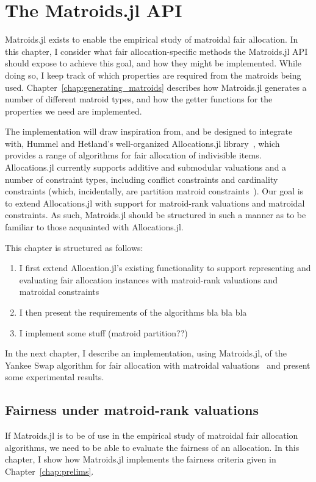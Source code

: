 \chapter{The Matroids.jl API}
\label{chap:matroids.jl}
Matroids.jl exists to enable the empirical study of matroidal fair allocation. In this chapter, I consider what fair allocation-specific methods the Matroids.jl API should expose to achieve this goal, and how they might be implemented. While doing so, I keep track of which properties are required from the matroids being used. Chapter~\ref{chap:generating_matroids} describes how Matroids.jl generates a number of different matroid types, and how the getter functions for the properties we need are implemented.

The implementation will draw inspiration from, and be designed to integrate with, Hummel and Hetland's well-organized Allocations.jl library~\cite{Hetland_Allocations_jl_2022}, which provides a range of algorithms for fair allocation of indivisible items. Allocations.jl currently supports additive and submodular valuations and a number of constraint types, including conflict constraints and cardinality constraints (which, incidentally, are partition matroid constraints~\cite{barman2020fair}). Our goal is to extend Allocations.jl with support for matroid-rank valuations and matroidal constraints. As such, Matroids.jl should be structured in such a manner as to be familiar to those acquainted with Allocations.jl.

This chapter is structured as follows:
\begin{enumerate}
    \item I first extend Allocation.jl's existing functionality to support representing and evaluating fair allocation instances with matroid-rank valuations and matroidal constraints
    \item I then present the requirements of the algorithms bla bla bla
    \item I implement some stuff (matroid partition??)
\end{enumerate}

In the next chapter, I describe an implementation, using Matroids.jl, of the Yankee Swap algorithm for fair allocation with matroidal valuations~\cite{viswanathan2023yankee} and present some experimental results.

\section{Fairness under matroid-rank valuations}
If Matroids.jl is to be of use in the empirical study of matroidal fair allocation algorithms, we need to be able to evaluate the fairness of an allocation. In this chapter, I show how Matroids.jl implements the fairness criteria given in Chapter~\ref{chap:prelims}.

